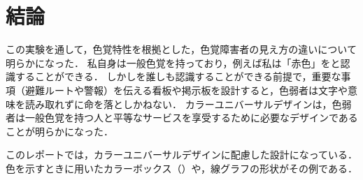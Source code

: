 \section{結論}
この実験を通して，色覚特性を根拠とした，色覚障害者の見え方の違いについて明らかになった．
私自身は一般色覚を持っており，例えば私は「赤色」をと認識することができる．
しかしを誰しも認識することができる前提で，重要な事項（避難ルートや警報）を伝える看板や掲示板を設計すると，色弱者は文字や意味を読み取れずに命を落としかねない．
カラーユニバーサルデザインは，色弱者は一般色覚を持つ人と平等なサービスを享受するために必要なデザインであることが明らかになった．\par
このレポートでは，カラーユニバーサルデザインに配慮した設計になっている．色を示すときに用いたカラーボックス（）や，線グラフの形状がその例である．
